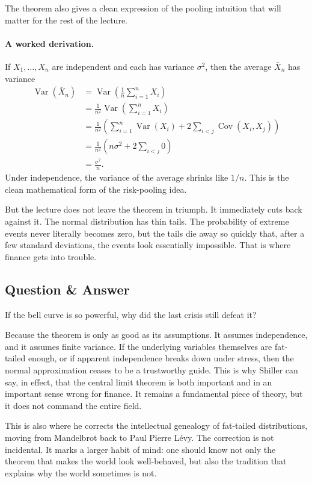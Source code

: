 The theorem also gives a clean expression of the pooling intuition that will matter for the rest of the lecture.

\paragraph{A worked derivation.}
If $X_1,\dots,X_n$ are independent and each has variance $\sigma^2$, then the average $\bar X_n$ has variance
\begin{align}
\operatorname{Var}(\bar X_n)
&=\operatorname{Var}\!\left(\frac{1}{n}\sum_{i=1}^n X_i\right)\\
&=\frac{1}{n^2}\operatorname{Var}\!\left(\sum_{i=1}^n X_i\right)\\
&=\frac{1}{n^2}\left(\sum_{i=1}^n \operatorname{Var}(X_i)+2\sum_{i<j}\operatorname{Cov}(X_i,X_j)\right)\\
&=\frac{1}{n^2}\left(n\sigma^2+2\sum_{i<j}0\right)\\
&=\frac{\sigma^2}{n}.
\end{align}
Under independence, the variance of the average shrinks like $1/n$. This is the clean mathematical form of the risk-pooling idea.

But the lecture does not leave the theorem in triumph. It immediately cuts back against it. The normal distribution has thin tails. The probability of extreme events never literally becomes zero, but the tails die away so quickly that, after a few standard deviations, the events look essentially impossible. That is where finance gets into trouble.

\subsection{Question \& Answer}

If the bell curve is so powerful, why did the last crisis still defeat it?

Because the theorem is only as good as its assumptions. It assumes independence, and it assumes finite variance. If the underlying variables themselves are fat-tailed enough, or if apparent independence breaks down under stress, then the normal approximation ceases to be a trustworthy guide. This is why Shiller can say, in effect, that the central limit theorem is both important and in an important sense wrong for finance. It remains a fundamental piece of theory, but it does not command the entire field.

This is also where he corrects the intellectual genealogy of fat-tailed distributions, moving from Mandelbrot back to Paul Pierre L\'evy. The correction is not incidental. It marks a larger habit of mind: one should know not only the theorem that makes the world look well-behaved, but also the tradition that explains why the world sometimes is not.


